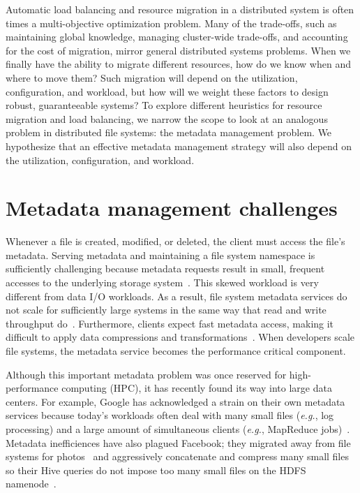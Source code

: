 Automatic load balancing and resource migration in a distributed system is often times a multi-objective optimization problem. Many of the trade-offs, such as maintaining global knowledge, managing cluster-wide trade-offs, and accounting for the cost of migration, mirror general distributed systems problems. When we finally have the ability to migrate different resources, how do we know when and where to move them? Such migration will depend on the utilization, configuration, and workload, but how will we weight these factors to design robust, guaranteeable systems? To explore different heuristics for resource migration and load balancing, we narrow the scope to look at an analogous problem in distributed file systems: the metadata management problem. We hypothesize that an effective metadata management strategy will also depend on the utilization, configuration, and workload. 

\section{Metadata management challenges}
Whenever a file is created, modified, or deleted, the client must access the file's metadata. Serving metadata and maintaining a file system namespace is sufficiently challenging because metadata requests result in small, frequent accesses to the underlying storage system~\cite{roselli:atec2000-FS-workloads}. This skewed workload is very different from data I/O workloads. As a result, file system metadata services do not scale for sufficiently large systems in the same way that read and write throughput do~\cite{abad:techreport2012-fstrace, abad:ucc2012-mimesis, alam:pdsw2011-metadata-scaling, weil:osdi2006-ceph}. Furthermore, clients expect fast metadata access, making it difficult to apply data compressions and transformations~\cite{leung:atc2008-nfs-trace}. When developers scale file systems, the metadata service becomes the performance critical component. 

Although this important metadata problem was once reserved for high-performance computing (HPC), it has recently found its way into large data centers. For example, Google has acknowledged a strain on their own metadata services because today's workloads often deal with many small files ({\it e.g.}, log processing) and a large amount of simultaneous clients ({\it e.g.}, MapReduce jobs)~\cite{mckusick:acm2010-gfs-evolution}. Metadata inefficiences have also plagued Facebook; they migrated away from file systems for photos~\cite{beaver:osdi2010-haystack} and aggressively concatenate and compress many small files so their Hive queries do not impose too many small files on the HDFS namenode~\cite{thusoo:sigmod2010-facebook-infrastructure}. 

